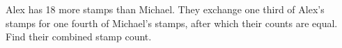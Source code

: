Alex has 18 more stamps than Michael. They exchange one third of Alex's stamps for one fourth of Michael's stamps, after which their counts are equal. Find their combined stamp count.
